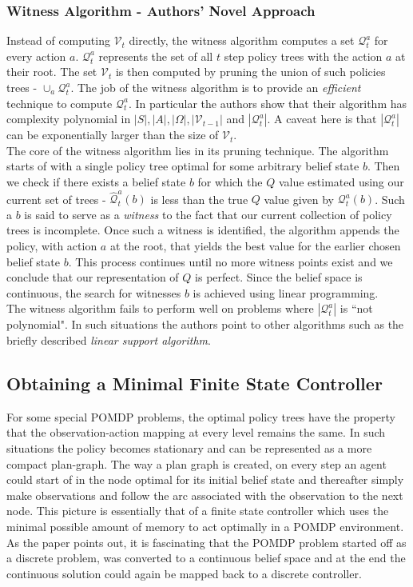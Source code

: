 \documentclass{article}
\begin{document}
\subsubsection*{Witness Algorithm - Authors' Novel Approach}
Instead of computing $\mathcal{V}_t$ directly, the witness algorithm computes a set $\mathcal{Q}_t^{a}$ for every action $a$. $\mathcal{Q}_t^{a}$ represents the set of all $t$ step policy trees with the action $a$ at their root. The set $\mathcal{V}_t$ is then computed by pruning the union of such policies trees - $\cup_a \mathcal{Q}_t^{a}$. The job of the witness algorithm is to provide an \textit{efficient} technique to compute $\mathcal{Q}_t^{a}$. In particular the authors show that their algorithm has complexity polynomial in $|S|,|A|,|\Omega|,|\mathcal{V}_{t-1}|$ and $|\mathcal{Q}_t^{a}|$. A caveat here is that $|\mathcal{Q}_t^{a}|$ can be exponentially larger than the size of $\mathcal{V}_t$.\\
The core of the witness algorithm lies in its pruning technique. The algorithm starts of with a single policy tree optimal for some arbitrary belief state $b$. Then we check if there exists a belief state $b$ for which the $Q$ value estimated using our current set of trees - $\hat{\mathcal{Q}}_{t}^{a}(b)$ is less than the true $Q$ value given by $\mathcal{Q}_{t}^{a}(b)$. Such a $b$ is said to serve as a \textit{witness} to the fact that our current collection of policy trees is incomplete. Once such a witness is identified, the algorithm appends the policy, with action $a$ at the root, that yields the best value for the earlier chosen belief state $b$. This process continues until no more witness points exist and we conclude that our representation of $Q$ is perfect. Since the belief space is continuous, the search for witnesses $b$ is achieved using linear programming.\\
The witness algorithm fails to perform well on problems where $|\mathcal{Q}_t^{a}|$ is ``not polynomial". In such situations the authors point to other algorithms such as the briefly described \textit{linear support algorithm}.

\subsection*{Obtaining a Minimal Finite State Controller}
For some special POMDP problems, the optimal policy trees have the property that the observation-action mapping at every level remains the same. In such situations the policy becomes stationary and can be represented as a more compact plan-graph. The way a plan graph is created, on every step an agent could start of in the node optimal for its initial belief state and thereafter simply make observations and follow the arc associated with the observation to the next node. This picture is essentially that of a finite state controller which uses the minimal possible amount of memory to act optimally in a POMDP environment. As the paper points out, it is fascinating that the POMDP problem started off as a discrete problem, was converted to a continuous belief space and at the end the continuous solution could again be mapped back to a discrete controller. \\
\end{document}
